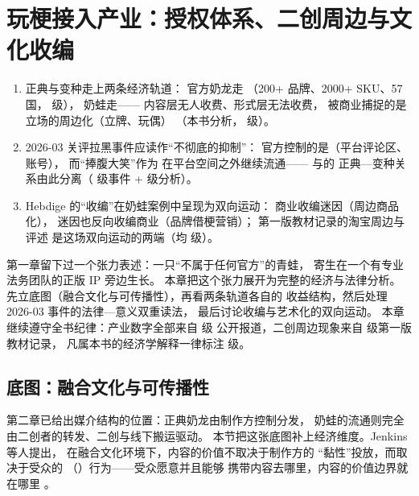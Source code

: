 \chapter{玩梗接入产业：授权体系、二创周边与文化收编}\label{ch:09}

\begin{nlkeypoints}
  \begin{enumerate}[label=(\arabic*),leftmargin=2.4em]
    \item 正典与变种走上两条经济轨道：
          官方奶龙走
          （200+ 品牌、2000+ SKU、57 国， 级），
          奶蛙走——
          内容层无人收费、形式层无法收费，
          被商业捕捉的是立场的周边化（立牌、玩偶）
          （本书分析， 级）。
    \item 2026-03 关评拉黑事件应读作“不彻底的抑制”：
          官方控制的是（平台评论区、账号），
          而“捧腹大笑”作为
          在平台空间之外继续流通——
          与的
          正典—变种关系由此分离（ 级事件 +  级分析）。
    \item Hebdige 的“收编”在奶蛙案例中呈现为双向运动：
          商业收编迷因（周边商品化），
          迷因也反向收编商业（品牌借梗营销）；
          第一版教材记录的淘宝周边与
          评述
          是这场双向运动的两端（均  级）。
  \end{enumerate}
\end{nlkeypoints}

第一章留下过一个张力表述：一只“不属于任何官方”的青蛙，
寄生在一个有专业法务团队的正版 IP 旁边生长。
本章把这个张力展开为完整的经济与法律分析。
先立底图（融合文化与可传播性），再看两条轨道各自的
收益结构，然后处理 2026-03 事件的法律—意义双重读法，
最后讨论收编与艺术化的双向运动。
本章继续遵守全书纪律：产业数字全部来自  级
公开报道，二创周边现象来自  级第一版教材记录，
凡属本书的经济学解释一律标注  级。

\section{底图：融合文化与可传播性}\label{sec:09:base}

第二章已给出媒介结构的位置：正典奶龙由制作方控制分发，
奶蛙的流通则完全由二创者的转发、二创与线下搬运驱动。
本节把这张底图补上经济维度。Jenkins 等人提出，
在融合文化环境下，内容的价值不取决于制作方的
“黏性”投放，而取决于受众的
（）行为——受众愿意并且能够
携带内容去哪里，内容的价值边界就在哪里
\cite{jenkins2013spreadable}。

